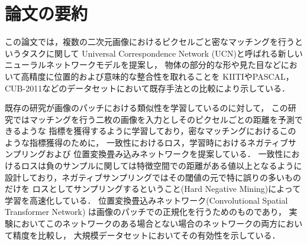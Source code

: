 \section{論文の要約}

この論文では，複数の二次元画像におけるピクセルごと密なマッチングを行うというタスクに関して
Universal Correspondence Network (UCN)と呼ばれる新しいニューラルネットワークモデルを提案し，
物体の部分的な形や見た目などにおいて高精度に位置的および意味的な整合性を取れることを
KIITIやPASCAL，CUB-2011などのデータセットにおいて既存手法との比較により示している．

既存の研究が画像のパッチにおける類似性を学習しているのに対して，
この研究ではマッチングを行う二枚の画像を入力としそのピクセルごとの距離を予測できるような
指標を獲得するように学習しており，密なマッチングにおけるこのような指標獲得のために，
一致性におけるロス，学習時におけるネガティブサンプリングおよび
位置変換畳み込みネットワークを提案している．
一致性におけるロスは負のサンプルに関しては特徴空間での距離がある値以上となるように
設計しており，ネガティブサンプリングではその閾値の元で特に誤りの多いものだけを
ロスとしてサンプリングするということ(Hard Negative Mining)によって学習を高速化している．
位置変換畳込みネットワーク(Convolutional Spatial Transformer Network)
は画像のパッチでの正規化を行うためのものであり，
実験においてこのネットワークのある場合とない場合のネットワークの両方において精度を比較し，
大規模データセットにおいてその有効性を示している．
